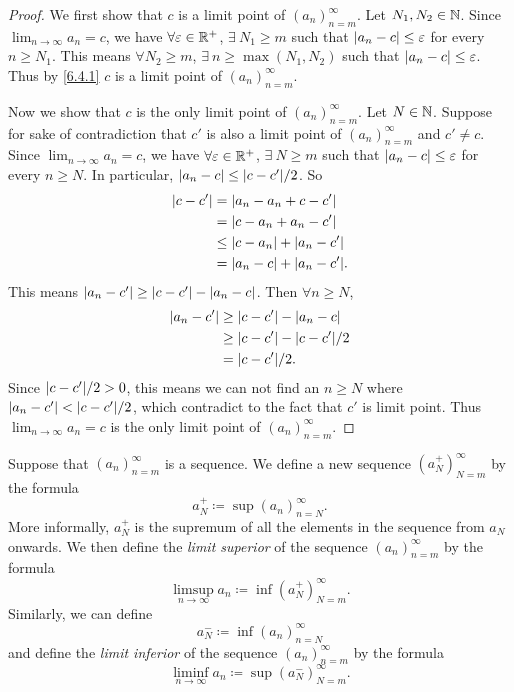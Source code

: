 \begin{proof}
  We first show that \(c\) is a limit point of \((a_n)_{n = m}^\infty\).
  Let \(N_1, N_2 \in \mathbb{N}\).
  Since \(\lim_{n \to \infty} a_n = c\), we have \(\forall \varepsilon \in \mathbb{R}^+\), \(\exists\ N_1 \geq m\) such that \(\left\lvert a_n - c\right\rvert \leq \varepsilon\) for every \(n \geq N_1\).
  This means \(\forall N_2 \geq m\), \(\exists\ n \geq \max(N_1, N_2)\) such that \(\left\lvert a_n - c\right\rvert \leq \varepsilon\).
  Thus by \cref{6.4.1} \(c\) is a limit point of \((a_n)_{n = m}^\infty\).

  Now we show that \(c\) is the only limit point of \((a_n)_{n = m}^\infty\).
  Let \(N \in \mathbb{N}\).
  Suppose for sake of contradiction that \(c'\) is also a limit point of \((a_n)_{n = m}^\infty\) and \(c' \neq c\).
  Since \(\lim_{n \to \infty} a_n = c\), we have \(\forall \varepsilon \in \mathbb{R}^+\), \(\exists\ N \geq m\) such that \(\left\lvert a_n - c\right\rvert \leq \varepsilon\) for every \(n \geq N\).
  In particular, \(\abs{a_n - c} \leq \abs{c - c'} / 2\).
  So
  \begin{align*}
    \abs{c - c'} & = \abs{a_n - a_n + c - c'}          \\
                 & = \abs{c - a_n + a_n - c'}          \\
                 & \leq \abs{c - a_n} + \abs{a_n - c'} \\
                 & = \abs{a_n - c} + \abs{a_n - c'}.
  \end{align*}
  This means \(\left\lvert a_n - c'\right\rvert \geq \left\lvert c - c'\right\rvert - \left\lvert a_n - c\right\rvert\).
  Then \(\forall n \geq N\),
  \begin{align*}
    \abs{a_n - c'} & \geq \abs{c - c'} - \abs{a_n - c}    \\
                   & \geq \abs{c - c'} - \abs{c - c'} / 2 \\
                   & = \abs{c - c'} / 2.
  \end{align*}
  Since \(\abs{c - c'} / 2 > 0\), this means we can not find an \(n \geq N\) where \(\abs{a_n - c'} < \abs{c - c'} / 2\), which contradict to the fact that \(c'\) is limit point.
  Thus \(\lim_{n \to \infty} a_n = c\) is the only limit point of \((a_n)_{n = m}^\infty\).
\end{proof}

\begin{defn}\label{6.4.6}
  Suppose that \((a_n)_{n = m}^\infty\) is a sequence.
  We define a new sequence \((a_N^+)_{N = m}^\infty\) by the formula
  \[
    a_N^+ \coloneqq \sup(a_n)_{n = N}^\infty.
  \]
  More informally, \(a_N^+\) is the supremum of all the elements in the sequence from \(a_N\) onwards.
  We then define the \emph{limit superior} of the sequence \((a_n)_{n = m}^\infty\) by the formula
  \[
    \limsup_{n \to \infty} a_n \coloneqq \inf(a_N^+)_{N = m}^\infty.
  \]
  Similarly, we can define
  \[
    a_N^- \coloneqq \inf(a_n)_{n = N}^\infty
  \]
  and define the \emph{limit inferior} of the sequence \((a_n)_{n = m}^\infty\) by the formula
  \[
    \liminf_{n \to \infty} a_n \coloneqq \sup(a_N^-)_{N = m}^\infty.
  \]
\end{defn}

